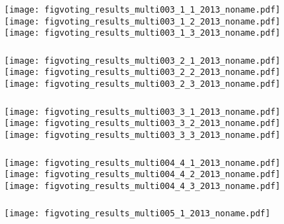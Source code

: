 \begin{frame}
  \frametitle{}

  \texttt{[image: figvoting\_results\_multi003\_1\_1\_2013\_noname.pdf]}\\
  \texttt{[image: figvoting\_results\_multi003\_1\_2\_2013\_noname.pdf]}\\
  \texttt{[image: figvoting\_results\_multi003\_1\_3\_2013\_noname.pdf]}

\end{frame}

\begin{frame}
  \frametitle{}

  \texttt{[image: figvoting\_results\_multi003\_2\_1\_2013\_noname.pdf]}\\
  \texttt{[image: figvoting\_results\_multi003\_2\_2\_2013\_noname.pdf]}\\
  \texttt{[image: figvoting\_results\_multi003\_2\_3\_2013\_noname.pdf]}

\end{frame}

\begin{frame}
  \frametitle{}

  \texttt{[image: figvoting\_results\_multi003\_3\_1\_2013\_noname.pdf]}\\
  \texttt{[image: figvoting\_results\_multi003\_3\_2\_2013\_noname.pdf]}\\
  \texttt{[image: figvoting\_results\_multi003\_3\_3\_2013\_noname.pdf]}

\end{frame}

\begin{frame}
  \frametitle{}

  \texttt{[image: figvoting\_results\_multi004\_4\_1\_2013\_noname.pdf]}\\
  \texttt{[image: figvoting\_results\_multi004\_4\_2\_2013\_noname.pdf]}\\
  \texttt{[image: figvoting\_results\_multi004\_4\_3\_2013\_noname.pdf]}

\end{frame}

\begin{frame}[plain]
  \frametitle{}

  \texttt{[image: figvoting\_results\_multi005\_1\_2013\_noname.pdf]}

\end{frame}

